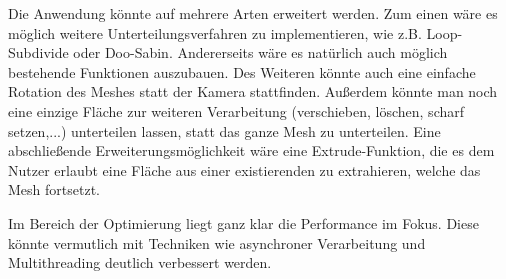 Die Anwendung könnte auf mehrere Arten erweitert werden.
Zum einen wäre es möglich weitere Unterteilungsverfahren zu implementieren, wie z.B. Loop-Subdivide oder Doo-Sabin.
Andererseits wäre es natürlich auch möglich bestehende Funktionen auszubauen.
Des Weiteren könnte auch eine einfache Rotation des Meshes statt der Kamera stattfinden.
Au\ss{}erdem könnte man noch eine einzige Fläche zur weiteren Verarbeitung (verschieben, löschen, scharf setzen,...) unterteilen lassen, statt das ganze Mesh zu unterteilen.
Eine abschlie\ss{}ende Erweiterungsmöglichkeit wäre eine Extrude-Funktion, die es dem Nutzer erlaubt eine Fläche aus einer existierenden zu extrahieren, welche das Mesh fortsetzt.

Im Bereich der Optimierung liegt ganz klar die Performance im Fokus. 
Diese könnte vermutlich mit Techniken wie asynchroner Verarbeitung und Multithreading deutlich verbessert werden.
